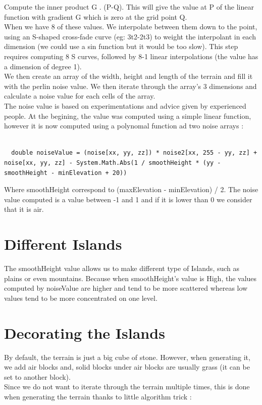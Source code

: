 \documentclass[article]{report}         %
\begin{document}
            Compute the inner product G . (P-Q). This will give the value at P of the linear function with gradient G which is zero at the grid point Q.\\

            When we have 8 of these values. We interpolate between them down to the point, using an S-shaped cross-fade curve (eg: 3t2-2t3) to weight the interpolant in each dimension (we could use a sin function but it would be too slow). This step requires computing 8 S curves, followed by 8-1 linear interpolations (the value has a dimension of degree 1).\\

            We then create an array of the width, height and length of the terrain and fill it with the perlin noise value. We then iterate through the array's 3 dimensions and calculate a noise value for each cells of the array.\\
            The noise value is based on experimentations and advice given by experienced people. At the begining, the value was computed using a simple linear function, however it is now computed using a polynomal function ad two noise arrays :

            \begin{lstlisting}
              
  double noiseValue = (noise[xx, yy, zz]) * noise2[xx, 255 - yy, zz] + noise[xx, yy, zz] - System.Math.Abs(1 / smoothHeight * (yy - smoothHeight - minElevation + 20))

            \end{lstlisting}

            Where smoothHeight correspond to (maxElevation - minElevation) / 2. The noise value computed is a value between -1 and 1 and if it is lower than 0 we consider that it is air.
      \section{Different Islands}
        The smoothHeight value allows us to make different type of Islands, such as plains or even mountains. Because when smoothHeight's value is High, the values computed by noiseValue are higher and tend to be more scattered whereas low values tend to be more concentrated on one level.

      \section{Decorating the Islands}
        By default, the terrain is just a big cube of stone. However, when generating it, we add air blocks and, solid blocks under air blocks are usually grass (it can be set to another block).\\
        Since we do not want to iterate through the terrain multiple times, this is done when generating the terrain thanks to little algorithm trick :\\
\end{document}
